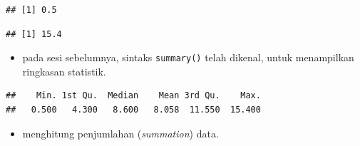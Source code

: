 \documentclass[
  12pt,
  a4paper,
]{scrbook}
\newenvironment{Shaded}{\begin{snugshade}}{\end{snugshade}}
\newcommand{\CommentTok}[1]{\textcolor[rgb]{0.56,0.35,0.01}{\textit{#1}}}
\newcommand{\KeywordTok}[1]{\textcolor[rgb]{0.13,0.29,0.53}{\textbf{#1}}}
\newcommand{\NormalTok}[1]{#1}
\newcommand{\OperatorTok}[1]{\textcolor[rgb]{0.81,0.36,0.00}{\textbf{#1}}}
\providecommand{\tightlist}{%
  \setlength{\itemsep}{0pt}\setlength{\parskip}{0pt}}
\begin{document}
\begin{Shaded}
\end{Shaded}

\begin{verbatim}
## [1] 0.5
\end{verbatim}

\begin{Shaded}
\end{Shaded}

\begin{verbatim}
## [1] 15.4
\end{verbatim}

\begin{itemize}
\tightlist
\item
  pada sesi sebelumnya, sintaks \texttt{summary()} telah dikenal, untuk
  menampilkan ringkasan statistik.
\end{itemize}

\begin{Shaded}
\end{Shaded}

\begin{verbatim}
##    Min. 1st Qu.  Median    Mean 3rd Qu.    Max. 
##   0.500   4.300   8.600   8.058  11.550  15.400
\end{verbatim}

\begin{itemize}
\tightlist
\item
  menghitung penjumlahan (\emph{summation}) data.
\end{itemize}

\begin{Shaded}
\end{Shaded}
\end{document}
